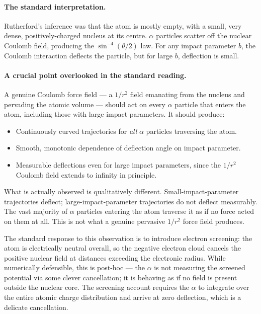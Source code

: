 \documentclass[11pt,a4paper]{article}
\theoremstyle{definition}
\theoremstyle{remark}
\begin{document}
\paragraph{The standard interpretation.} Rutherford's inference was that the atom is mostly empty, with a small, very dense, positively-charged nucleus at its centre. $\alpha$ particles scatter off the nuclear Coulomb field, producing the $\sin^{-4}(\theta/2)$ law. For any impact parameter $b$, the Coulomb interaction deflects the particle, but for large $b$, deflection is small.

\paragraph{A crucial point overlooked in the standard reading.} A genuine Coulomb force field --- a $1/r^2$ field emanating from the nucleus and pervading the atomic volume --- should act on every $\alpha$ particle that enters the atom, including those with large impact parameters. It should produce:

\begin{itemize}[leftmargin=2em,itemsep=2pt]
\item Continuously curved trajectories for \emph{all} $\alpha$ particles traversing the atom.
\item Smooth, monotonic dependence of deflection angle on impact parameter.
\item Measurable deflections even for large impact parameters, since the $1/r^2$ Coulomb field extends to infinity in principle.
\end{itemize}

What is actually observed is qualitatively different. Small-impact-parameter trajectories deflect; large-impact-parameter trajectories do not deflect measurably. The vast majority of $\alpha$ particles entering the atom traverse it as if no force acted on them at all. This is not what a genuine pervasive $1/r^2$ force field produces.

The standard response to this observation is to introduce electron screening: the atom is electrically neutral overall, so the negative electron cloud cancels the positive nuclear field at distances exceeding the electronic radius. While numerically defensible, this is post-hoc --- the $\alpha$ is not measuring the screened potential via some clever cancellation; it is behaving as if no field is present outside the nuclear core. The screening account requires the $\alpha$ to integrate over the entire atomic charge distribution and arrive at zero deflection, which is a delicate cancellation.
\end{document}
